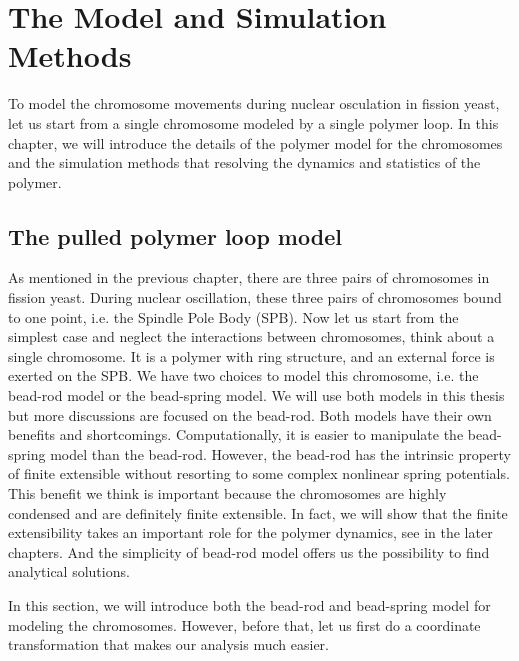 
\chapter{The Model and Simulation Methods}
\graphicspath{{Chapter2/Figs/}}

To model the chromosome movements during nuclear osculation in fission yeast, let us start from a single chromosome modeled by a single polymer loop. 
In this chapter, we will introduce the details of the polymer model for the chromosomes and the simulation methods that resolving the dynamics and statistics of the polymer. 


\section{The pulled polymer loop model}
\label{sec:the_pulled_polymer_loop_model}

As mentioned in the previous chapter, there are three pairs of chromosomes in fission yeast. During nuclear oscillation, these three pairs of chromosomes bound to one point, i.e. the Spindle Pole Body (SPB). Now let us start from the simplest case and neglect the interactions between chromosomes, think about a single chromosome. It is a polymer with ring structure, and an external force is exerted on the SPB. We have two choices to model this chromosome, i.e. the bead-rod model or the bead-spring model. We will use both models in this thesis but more discussions are focused on the bead-rod. Both models have their own benefits and shortcomings. Computationally, it is easier to manipulate the bead-spring model than the bead-rod. However, the bead-rod has the intrinsic property of finite extensible without resorting to some complex nonlinear spring potentials. This benefit we think is important because the chromosomes are highly condensed and are definitely finite extensible. In fact, we will show that the finite extensibility takes an important role for the polymer dynamics, see in the later chapters. And the simplicity of bead-rod model offers us the possibility to find analytical solutions. 

In this section, we will introduce both the bead-rod and bead-spring model for modeling the chromosomes. However, before that, let us first do a coordinate transformation that makes our analysis much easier. 

